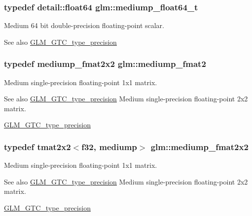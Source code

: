 \subsubsection[{mediump\+\_\+float64\+\_\+t}]{\setlength{\rightskip}{0pt plus 5cm}typedef detail\+::float64 {\bf glm\+::mediump\+\_\+float64\+\_\+t}}\label{namespaceglm_a97a0747b103eb5ef320a91888de52f51}
Medium 64 bit double-\/precision floating-\/point scalar. \begin{DoxySeeAlso}{See also}
\hyperlink{group__gtc__type__precision}{G\+L\+M\+\_\+\+G\+T\+C\+\_\+type\+\_\+precision} 
\end{DoxySeeAlso}
\hypertarget{namespaceglm_a5b9de77ef7403ffc972700219eca5450}{}
\subsubsection[{mediump\+\_\+fmat2}]{\setlength{\rightskip}{0pt plus 5cm}typedef {\bf mediump\+\_\+fmat2x2} {\bf glm\+::mediump\+\_\+fmat2}}\label{namespaceglm_a5b9de77ef7403ffc972700219eca5450}
Medium single-\/precision floating-\/point 1x1 matrix. \begin{DoxySeeAlso}{See also}
\hyperlink{group__gtc__type__precision}{G\+L\+M\+\_\+\+G\+T\+C\+\_\+type\+\_\+precision} Medium single-\/precision floating-\/point 2x2 matrix. 

\hyperlink{group__gtc__type__precision}{G\+L\+M\+\_\+\+G\+T\+C\+\_\+type\+\_\+precision} 
\end{DoxySeeAlso}
\hypertarget{namespaceglm_a933dc07be88e05bf16cd823e99abf860}{}
\subsubsection[{mediump\+\_\+fmat2x2}]{\setlength{\rightskip}{0pt plus 5cm}typedef tmat2x2$<${\bf f32}, mediump$>$ {\bf glm\+::mediump\+\_\+fmat2x2}}\label{namespaceglm_a933dc07be88e05bf16cd823e99abf860}
Medium single-\/precision floating-\/point 1x1 matrix. \begin{DoxySeeAlso}{See also}
\hyperlink{group__gtc__type__precision}{G\+L\+M\+\_\+\+G\+T\+C\+\_\+type\+\_\+precision} Medium single-\/precision floating-\/point 2x2 matrix. 

\hyperlink{group__gtc__type__precision}{G\+L\+M\+\_\+\+G\+T\+C\+\_\+type\+\_\+precision} 
\end{DoxySeeAlso}
\hypertarget{namespaceglm_a96eb5212b42c69eb09c0efc057fab4a1}{}
